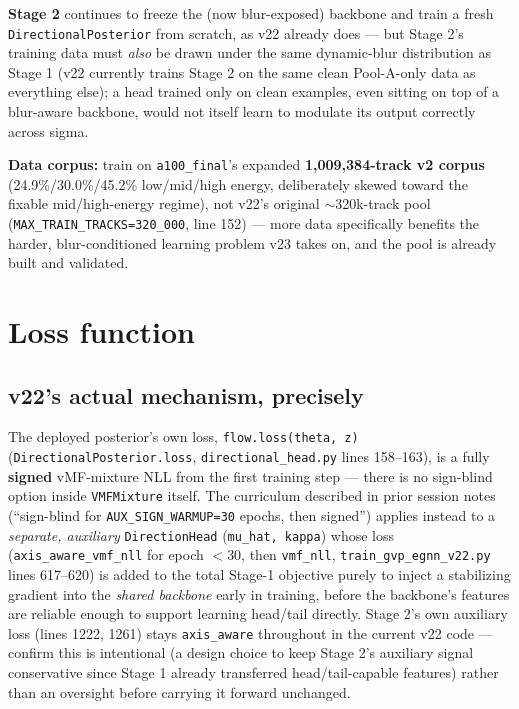 \documentclass[11pt]{article}
\newcommand{\code}[1]{\texttt{#1}}
\begin{document}
\textbf{Stage 2} continues to freeze the (now blur-exposed) backbone and train a fresh
\code{DirectionalPosterior} from scratch, as v22 already does --- but Stage 2's training data
must \emph{also} be drawn under the same dynamic-blur distribution as Stage 1 (v22 currently
trains Stage 2 on the same clean Pool-A-only data as everything else); a head trained only on
clean examples, even sitting on top of a blur-aware backbone, would not itself learn to
modulate its output correctly across sigma.

\textbf{Data corpus:} train on \code{a100\_final}'s expanded \textbf{1{,}009{,}384-track v2
corpus} (24.9\%/30.0\%/45.2\% low/mid/high energy, deliberately skewed toward the
fixable mid/high-energy regime), not v22's original $\sim$320k-track pool
(\code{MAX\_TRAIN\_TRACKS=320\_000}, line 152) --- more data specifically benefits the
harder, blur-conditioned learning problem v23 takes on, and the pool is already built and
validated.

\section{Loss function}
\label{sec:loss}

\subsection{v22's actual mechanism, precisely}
The deployed posterior's own loss, \code{flow.loss(theta, z)}
(\code{DirectionalPosterior.loss}, \code{directional\_head.py} lines 158--163), is a fully
\textbf{signed} vMF-mixture NLL from the first training step --- there is no sign-blind
option inside \code{VMFMixture} itself. The curriculum described in prior session notes
(``sign-blind for \code{AUX\_SIGN\_WARMUP=30} epochs, then signed'') applies instead to a
\emph{separate, auxiliary} \code{DirectionHead} (\code{mu\_hat, kappa}) whose loss
(\code{axis\_aware\_vmf\_nll} for epoch $<$30, then \code{vmf\_nll}, \code{train\_gvp\_egnn\_v22.py}
lines 617--620) is added to the total Stage-1 objective purely to inject a stabilizing
gradient into the \emph{shared backbone} early in training, before the backbone's features are
reliable enough to support learning head/tail directly. Stage 2's own auxiliary loss
(lines 1222, 1261) stays \code{axis\_aware} throughout in the current v22 code — confirm
this is intentional (a design choice to keep Stage 2's auxiliary signal conservative since
Stage 1 already transferred head/tail-capable features) rather than an oversight before
carrying it forward unchanged.
\end{document}
